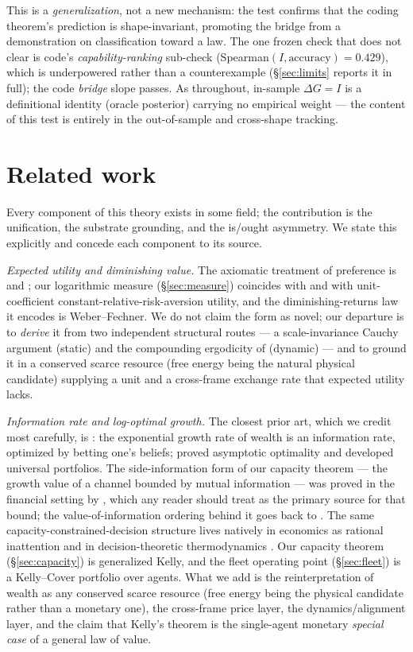 \documentclass[11pt]{article}
\theoremstyle{plain}
\theoremstyle{definition}
\theoremstyle{remark}
\newcommand{\I}{I}
\begin{document}
\noindent This is a \emph{generalization}, not a new mechanism: the test confirms that the coding theorem's
prediction is shape-invariant, promoting the bridge from a demonstration on classification toward a law. The one
frozen check that does not clear is code's \emph{capability-ranking} sub-check
(Spearman$(\I,\text{accuracy})=0.429$), which is underpowered rather than a counterexample (\S\ref{sec:limits}
reports it in full); the code \emph{bridge} slope passes. As throughout, in-sample $\Delta G=\I$ is a
definitional identity (oracle posterior) carrying no empirical weight --- the content of this test is entirely in
the out-of-sample and cross-shape tracking.

\section{Related work}\label{sec:related}

Every component of this theory exists in some field; the contribution is the unification, the substrate
grounding, and the is/ought asymmetry. We state this explicitly and concede each component to its source.

\emph{Expected utility and diminishing value.} The axiomatic treatment of preference is \citet{vnm1944} and
\citet{savage1954}; our logarithmic measure (\S\ref{sec:measure}) coincides with \citet{bernoulli1738} and with
unit-coefficient constant-relative-risk-aversion utility, and the diminishing-returns law it encodes is
Weber--Fechner. We do not claim the form as novel; our departure is to \emph{derive} it from two independent structural
routes --- a scale-invariance Cauchy argument (static) and the compounding ergodicity of \citet{peters2019}
(dynamic) --- and to ground it in a conserved scarce resource (free energy being the natural physical
candidate) supplying a unit and a cross-frame exchange rate that expected utility lacks.

\emph{Information rate and log-optimal growth.} The closest prior art, which we credit most carefully, is
\citet{kelly1956}: the exponential growth rate of wealth is an information rate, optimized by betting one's
beliefs; \citet{breiman1961} proved asymptotic optimality and \citet{cover1991} developed universal portfolios.
The side-information form of our capacity theorem --- the growth value of a channel bounded by mutual
information --- was proved in the financial setting by \citet{barroncover1988}, which any reader should treat
as the primary source for that bound; the value-of-information ordering behind it goes back to
\citet{blackwell1953}. The same capacity-constrained-decision structure lives natively in economics as
rational inattention \citep{sims2003} and in decision-theoretic thermodynamics \citep{ortegabraun2013}.
Our capacity theorem (\S\ref{sec:capacity}) is generalized Kelly, and the fleet operating point (\S\ref{sec:fleet})
is a Kelly--Cover portfolio over agents. What we add is the reinterpretation of wealth as any conserved scarce resource (free energy being the physical
candidate rather than a monetary one), the cross-frame price layer, the dynamics/alignment layer, and the claim that
Kelly's theorem is the single-agent monetary \emph{special case} of a general law of value.
\end{document}
